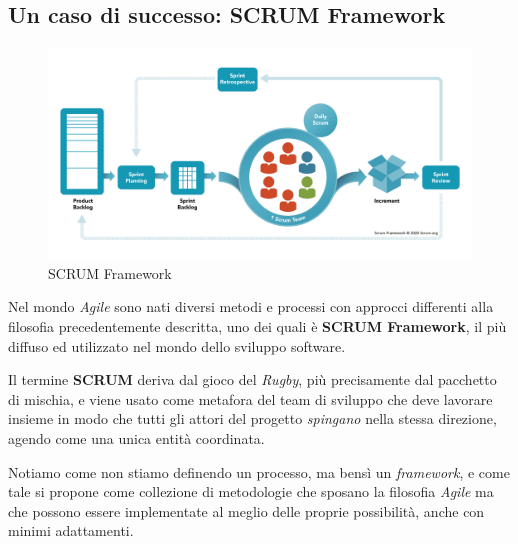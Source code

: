 \documentclass[a4paper,12pt]{report}
\begin{document}
			\subsection{Un caso di successo: SCRUM Framework}
			
				\begin{figure}[h]
					\centering
					\includegraphics[width=1\textwidth]{scrum}
					\caption{SCRUM Framework}
					\label{fig:scrum}
				\end{figure}
			
				Nel mondo \emph{Agile} sono nati diversi metodi e processi con approcci differenti alla filosofia precedentemente descritta, uno dei quali è \textbf{SCRUM Framework}, il più diffuso ed utilizzato nel mondo dello sviluppo software.
				
				Il termine \textbf{SCRUM} deriva dal gioco del \emph{Rugby}, più precisamente dal pacchetto di mischia, e viene usato
				come metafora del team di sviluppo che deve lavorare insieme in modo che tutti gli attori del progetto \emph{spingano}
				nella stessa direzione, agendo come una unica entità coordinata.
				
				Notiamo come non stiamo definendo un processo, ma bensì un \emph{framework}, e come tale si propone come
				collezione di metodologie che sposano la filosofia \emph{Agile} ma che possono essere implementate al meglio
				delle proprie possibilità, anche con minimi adattamenti.
				
\end{document}
